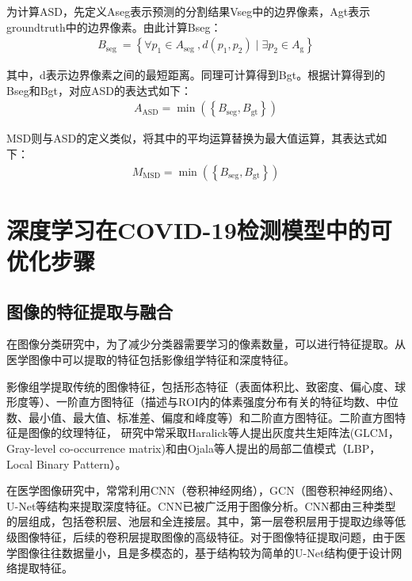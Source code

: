 \documentclass[journal,twoside,web]{ieeecolor}
\begin{document}
为计算ASD，先定义Aseg表示预测的分割结果Vseg中的边界像素，Agt表示groundtruth中的边界像素。由此计算Bseg：
\begin{equation}
\begin{array}{l}
B_{\text {seg }}=\left\{\forall p_{1} \in A_{\text {seg }}, d\left(p_{1}, p_{2}\right) \mid \exists p_{2} \in A_{\mathrm{g}}\right\}
\end{array}
\end{equation}

其中，d表示边界像素之间的最短距离。同理可计算得到Bgt。根据计算得到的Bseg和Bgt，对应ASD的表达式如下：
\begin{equation}
\begin{array}{l}
A_{\mathrm{ASD}}=\min \left(\left\{B_{\mathrm{seg}}, B_{\mathrm{gt}}\right\}\right)
\end{array}
\end{equation}

MSD则与ASD的定义类似，将其中的平均运算替换为最大值运算，其表达式如下：
\begin{equation}
\begin{array}{l}
M_{\mathrm{MSD}}=\min \left(\left\{B_{\mathrm{seg}}, B_{\mathrm{gt}}\right\}\right)
\end{array}
\end{equation}
\section{深度学习在COVID-19检测模型中的可优化步骤}
\subsection{图像的特征提取与融合}
在图像分类研究中，为了减少分类器需要学习的像素数量，可以进行特征提取。从医学图像中可以提取的特征包括影像组学特征和深度特征。

影像组学提取传统的图像特征，包括形态特征（表面体积比、致密度、偏心度、球形度等）、一阶直方图特征（描述与ROI内的体素强度分布有关的特征均数、中位数、最小值、最大值、标准差、偏度和峰度等）和二阶直方图特征。二阶直方图特征是图像的纹理特征， 研究中常采取Haralick等人提出灰度共生矩阵法(GLCM， Gray-level co-occurrence matrix)和由Ojala等人提出的局部二值模式（LBP，Local Binary Pattern）。

在医学图像研究中，常常利用CNN（卷积神经网络），GCN（图卷积神经网络）、U-Net等结构来提取深度特征。CNN已被广泛用于图像分析。CNN都由三种类型的层组成，包括卷积层、池层和全连接层。其中，第一层卷积层用于提取边缘等低级图像特征，后续的卷积层提取图像的高级特征。对于图像特征提取问题，由于医学图像往往数据量小，且是多模态的，基于结构较为简单的U-Net结构便于设计网络提取特征。
\end{document}
